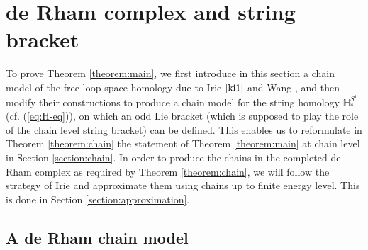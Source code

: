 \documentclass[a4paper]{article}
\numberwithin{equation}{section}
\begin{document}
\section{de Rham complex and string bracket}\label{section:dR-BV}

To prove Theorem \ref{theorem:main}, we first introduce in this section a chain model of the free loop space homology due to Irie $\cite{ki1}$ and Wang \cite{ywt}, and then modify their constructions to produce a chain model for the string homology $\mathbb{H}_\ast^{S^1}$ (cf. (\ref{eq:H-eq})), on which an odd Lie bracket (which is supposed to play the role of the chain level string bracket) can be defined. This enables us to reformulate in Theorem \ref{theorem:chain} the statement of Theorem \ref{theorem:main} at chain level in Section \ref{section:chain}. In order to produce the chains in the completed de Rham complex as required by Theorem \ref{theorem:chain}, we will follow the strategy of Irie \cite{ki2} and approximate them using chains up to finite energy level. This is done in Section \ref{section:approximation}.

\subsection{A de Rham chain model}\label{section:de Rham}
\end{document}
